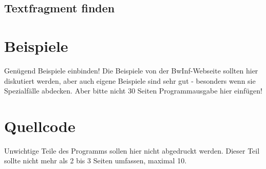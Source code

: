 \subsection{Textfragment finden}\label{subsec:textfragment-finden}



\section{Beispiele}\label{sec:beispiele}
Genügend Beispiele einbinden!
Die Beispiele von der BwInf-Webseite sollten hier diskutiert werden, aber auch eigene Beispiele sind sehr gut - besonders wenn sie Spezialfälle abdecken.
Aber bitte nicht 30 Seiten Programmausgabe hier einfügen!


\section{Quellcode}\label{sec:quellcode}
Unwichtige Teile des Programms sollen hier nicht abgedruckt werden.
Dieser Teil sollte nicht mehr als 2 bis 3 Seiten umfassen, maximal 10.
